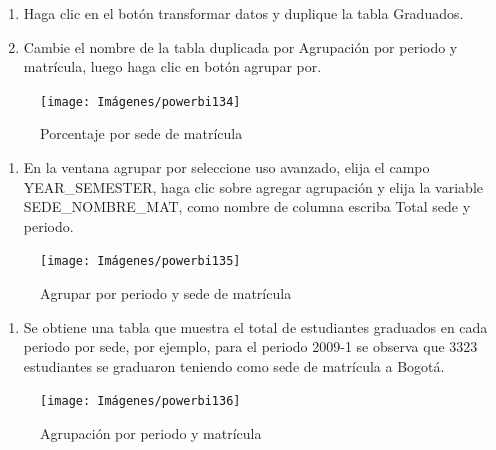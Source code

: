 \documentclass[
]{book}
\providecommand{\tightlist}{%
  \setlength{\itemsep}{0pt}\setlength{\parskip}{0pt}}
\begin{document}
\begin{enumerate}
\def\labelenumi{\arabic{enumi}.}
\item
  Haga clic en el botón transformar datos y duplique la tabla Graduados.
\item
  Cambie el nombre de la tabla duplicada por Agrupación por periodo y matrícula, luego haga clic en botón agrupar por.
\end{enumerate}

\begin{figure}

{\centering \texttt{[image: Imágenes/powerbi134]} 

}

\caption{Porcentaje por sede de matrícula}\label{fig:agruparporperiodosede-fig}
\end{figure}

\begin{enumerate}
\def\labelenumi{\arabic{enumi}.}
\setcounter{enumi}{2}
\tightlist
\item
  En la ventana agrupar por seleccione uso avanzado, elija el campo YEAR\_SEMESTER, haga clic sobre agregar agrupación y elija la variable SEDE\_NOMBRE\_MAT, como nombre de columna escriba Total sede y periodo.
\end{enumerate}

\begin{figure}

{\centering \texttt{[image: Imágenes/powerbi135]} 

}

\caption{Agrupar por periodo y sede de matrícula}\label{fig:agruparporperiodosedematricula-fig}
\end{figure}

\begin{enumerate}
\def\labelenumi{\arabic{enumi}.}
\setcounter{enumi}{3}
\tightlist
\item
  Se obtiene una tabla que muestra el total de estudiantes graduados en cada periodo por sede, por ejemplo, para el periodo 2009-1 se observa que 3323 estudiantes se graduaron teniendo como sede de matrícula a Bogotá.
\end{enumerate}

\begin{figure}

{\centering \texttt{[image: Imágenes/powerbi136]} 

}

\caption{Agrupación por periodo y matrícula}\label{fig:agrpacionporperiodoymatricula-fig}
\end{figure}
\end{document}

